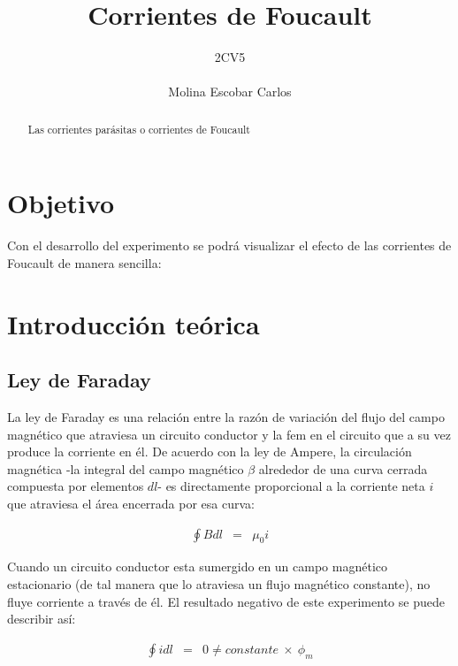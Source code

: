\documentclass[11pt]{article}
\title{Corrientes de Foucault}
\author{2CV5\\\\Molina Escobar Carlos}
\date{}
\begin{document}
	
\maketitle

\begin{abstract}

	Las corrientes parásitas o corrientes de Foucault 

\end{abstract}


\begin{multicols}{2}

\section{Objetivo}
	Con el desarrollo del experimento se podrá visualizar el efecto de las corrientes de Foucault de manera sencilla:
	
\section{Introducción teórica}
	
	\subsection{Ley de Faraday}

		La ley de Faraday es una relación entre la razón de variación del flujo del campo magnético que atraviesa un circuito conductor y la fem en el circuito que a su vez produce la corriente en él. De acuerdo con la ley de Ampere, la circulación magnética -la integral del campo magnético $\beta$ alrededor de una curva cerrada compuesta por elementos $dl$- es directamente proporcional a la corriente neta $i$ que atraviesa el área encerrada por esa curva:

		\begin{eqnarray}
			\oint B dl &=& \mu _0 i\label{eq:1}
		\end{eqnarray}

		Cuando un circuito conductor esta sumergido en un campo magnético estacionario (de tal manera que lo atraviesa un flujo magnético constante), no fluye corriente a través de él. El resultado negativo de este experimento se puede describir así: 
		
		\begin{eqnarray}
			\oint i dl &=& 0 \not = constante \: \times \: \phi _m\label{eq:2}
		\end{eqnarray}


\end{multicols}
\end{document}
